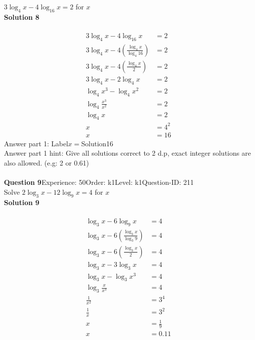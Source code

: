 \documentclass{article}
\begin{document}
$3\log_{4}x-4\log_{16}x=2$ for $x$\\[4pt]
\noindent\textbf{Solution 8}\\[2pt]
\\[-35pt]\begin{align*}
3\log_{4}x-4\log_{16}x&=2\\[2pt]
3\log_{4}x-4\left(\displaystyle\frac{\log_{4}x}{\log_{4}16}\right)&=2\\[2pt]
3\log_{4}x-4\left(\displaystyle\frac{\log_{4}x}{2}\right)&=2\\[2pt]
3\log_{4}x-2\log_{4}x&=2\\[2pt]
\log_{4}x^3-\log_{4}x^2&=2\\[2pt]
\log_{4}\displaystyle\frac{x^3}{x^2}&=2\\[2pt]
\log_{4} x&=2\\[2pt]
x&=4^2\\[2pt]
x&=16
\end{align*}
Answer part 1: \hspace{10pt}Label\hspace{10pt}$x=$\hspace{10pt}Solution\hspace{10pt}16\\
Answer part 1 hint: \hspace{15pt}Give all solutions correct to 2 d.p, exact integer solutions are also allowed. (e.g: 2 or 0.61)\\
\\[4pt]
\noindent\textbf{Question 9}\hspace{20pt}Experience: 50\hspace{20pt}Order: k1\hspace{20pt}Level: k1\hspace{20pt}Question-ID: 211\\[2pt]
Solve $2\log_{3}x-12\log_{9}x=4$ for $x$\\[4pt]
\noindent\textbf{Solution 9}\\[2pt]
\\[-35pt]\begin{align*}
\log_{3}x-6\log_{9}x&=4\\[2pt]
\log_{3}x-6\left(\displaystyle\frac{\log_{3}x}{\log_{3}9}\right)&=4\\[2pt]
\log_{3}x-6\left(\displaystyle\frac{\log_{3}x}{2}\right)&=4\\[2pt]
\log_{3}x-3\log_{3}x&=4\\[2pt]
\log_{3}x-\log_{3}x^3&=4\\[2pt]
\log_{3}\displaystyle\frac{x}{x^3}&=4\\[2pt]
\displaystyle\frac{1}{x^2}&=3^4\\[2pt]
\displaystyle\frac{1}{x}&=3^2\\[2pt]
x&=\displaystyle\frac{1}{9}\\[2pt]
x&=0.11
\end{align*}
\end{document}
